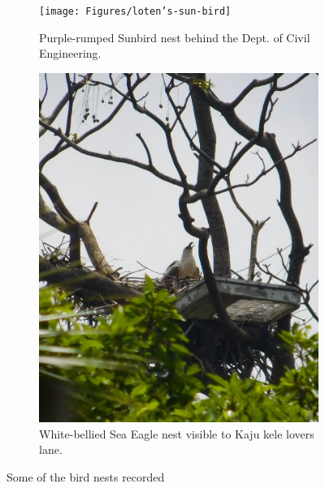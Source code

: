 \begin{figure}[!htpb]
    
    \begin{subfigure}{0.45\textwidth}
        \texttt{[image: Figures/loten's-sun-bird]}
        \caption{Purple-rumped Sunbird nest behind the Dept. of Civil Engineering.}
        \label{fig:figure-02.2}
    \end{subfigure}
    \hspace{.5cm} %
    \begin{subfigure}{0.45\textwidth}
        \includegraphics[width=\textwidth]{Figures/white-bellied-sea-eagle.jpg}
        \caption{White-bellied Sea Eagle nest visible to Kaju kele lovers lane.}
        \label{fig:figure-02.2}
    \end{subfigure}
    \caption{Some of the bird nests recorded}
    \label{fig:figure-02}
\end{figure}
